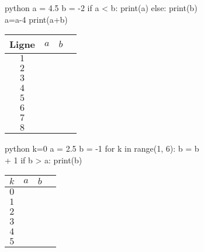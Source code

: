 \begin{figure}[h]
\begin{subfigure}{.5\textwidth}
\vspace{15pt}
\begin{mintedbox}{python}
a = 4.5
b = -2
if a < b:
	print(a)
else:
	print(b)
a=a-4
print(a+b)
\end{mintedbox}
\end{subfigure}
\hfill
\begin{subfigure}{.4\textwidth}
	\begin{tabular}{|c|c|c|c|}\hline
		Ligne & $a$ & $b$ \\ \hline
		$1$ && \\ \hline
		$2$ && \\ \hline
		$3$ && \\ \hline
		$4$ && \\ \hline
		$5$ && \\ \hline
		$6$ && \\ \hline
		$7$ && \\ \hline
		$8$ && \\ \hline
	\end{tabular}
\end{subfigure}

\begin{subfigure}{.5\textwidth}
\vspace{15pt}
\begin{mintedbox}{python}
k=0
a = 2.5
b = -1
for k in range(1, 6):
	b = b + 1
	if b > a:
		print(b)
\end{mintedbox}
\end{subfigure}
\hfill
\begin{subfigure}{.45\textwidth}
	\begin{tabular}{|c|c|c|c|}\hline
		$k$ & $a$ & $b$ \\ \hline
		$0$ && \\ \hline
		$1$ && \\ \hline
		$2$ && \\ \hline
		$3$ && \\ \hline
		$4$ && \\ \hline
		$5$ && \\ \hline
	\end{tabular}
\end{subfigure}


\end{figure}
